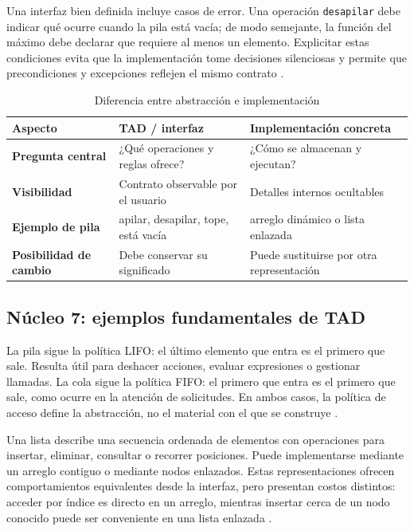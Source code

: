 \documentclass[12pt,letterpaper]{article}
\newcommand{\codigo}[1]{\texttt{#1}}
\begin{document}
Una interfaz bien definida incluye casos de error. Una operación \codigo{desapilar} debe indicar qué ocurre cuando la pila está vacía; de modo semejante, la función del máximo debe declarar que requiere al menos un elemento. Explicitar estas condiciones evita que la implementación tome decisiones silenciosas y permite que precondiciones y excepciones reflejen el mismo contrato \citep{liskov1974,apt2009,goodrichpy2013}.

\begin{table}[htbp]
\centering
\caption{Diferencia entre abstracción e implementación}
\begin{tabularx}{\textwidth}{>{\bfseries}p{3cm}XX}
\toprule
Aspecto & TAD / interfaz & Implementación concreta\\
\midrule
Pregunta central & ¿Qué operaciones y reglas ofrece? & ¿Cómo se almacenan y ejecutan?\\
Visibilidad & Contrato observable por el usuario & Detalles internos ocultables\\
Ejemplo de pila & apilar, desapilar, tope, está vacía & arreglo dinámico o lista enlazada\\
Posibilidad de cambio & Debe conservar su significado & Puede sustituirse por otra representación\\
\bottomrule
\end{tabularx}
\end{table}

\subsection{Núcleo 7: ejemplos fundamentales de TAD}

La pila sigue la política LIFO: el último elemento que entra es el primero que sale. Resulta útil para deshacer acciones, evaluar expresiones o gestionar llamadas. La cola sigue la política FIFO: el primero que entra es el primero que sale, como ocurre en la atención de solicitudes. En ambos casos, la política de acceso define la abstracción, no el material con el que se construye \citep{sedgewick2011,goodrichpy2013,goodrichcpp2011}.

Una lista describe una secuencia ordenada de elementos con operaciones para insertar, eliminar, consultar o recorrer posiciones. Puede implementarse mediante un arreglo contiguo o mediante nodos enlazados. Estas representaciones ofrecen comportamientos equivalentes desde la interfaz, pero presentan costos distintos: acceder por índice es directo en un arreglo, mientras insertar cerca de un nodo conocido puede ser conveniente en una lista enlazada \citep{goodrichpy2013,goodrichcpp2011,skiena2020}.
\end{document}
